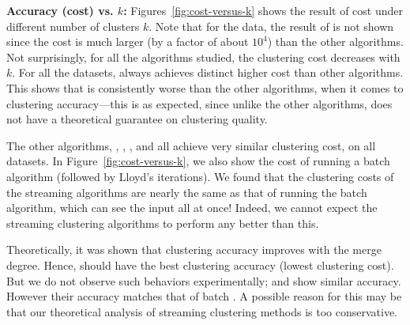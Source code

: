 
{\bf Accuracy (\km cost) vs. $k$:} Figures~\ref{fig:cost-versus-k} 
shows the result of \km cost under different number of clusters $k$. 
Note that for the \intrusion data, the result of \seqkm is not shown 
since the cost is much larger (by a factor of about ${10}^4$) than 
the other algorithms. Not surprisingly, for all the algorithms studied, 
the clustering cost decreases with $k$. 
For all the datasets, \seqkm always achieves distinct higher \km cost than other algorithms. 
This shows that \seqkm is consistently worse than the other algorithms, 
when it comes to clustering accuracy---this is as expected, since
unlike the other algorithms, \seqkm does not have a theoretical guarantee on
clustering quality.

The other algorithms, \skmpp, \cc, \rcc, and \hybrid all achieve very similar
clustering cost, on all datasets. In Figure~\ref{fig:cost-versus-k}, we also
show the cost of running a batch algorithm \kmpp (followed by Lloyd's iterations). 
We found that the clustering costs of the streaming algorithms are nearly 
the same as that of running the batch algorithm, which can see the input all at once! 
Indeed, we cannot expect the streaming clustering algorithms to perform any better than this.

Theoretically, it was shown that clustering accuracy improves with the merge
degree.  Hence, \rcc should have the best clustering accuracy (lowest
clustering cost). But we do not observe such behaviors experimentally; 
\rcc and \skmpp show similar accuracy. However their accuracy matches that of batch \kmpp. 
A possible reason for this may be that our theoretical analysis of streaming
clustering methods is too conservative. 

